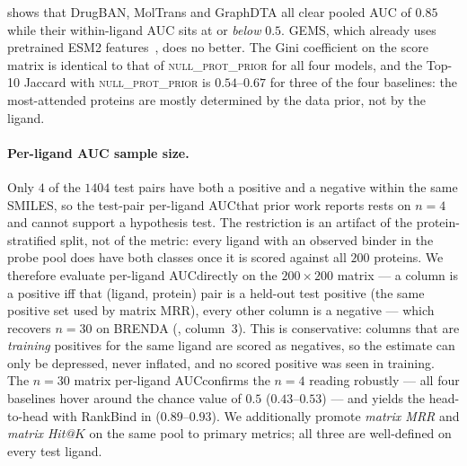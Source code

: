 \documentclass[11pt,a4paper]{article}
\newcommand{\method}{RankBind\xspace}
\newcommand{\nullprior}{\textsc{null\_prot\_prior}\xspace}
\newcommand{\plauc}{per-ligand AUC}
\newcommand{\matmrr}{matrix MRR}
\begin{document}
 shows that DrugBAN, MolTrans and GraphDTA all clear
pooled AUC of $0.85$ while their within-ligand AUC sits at or
\emph{below} $0.5$. GEMS, which already uses pretrained ESM2
features~\citep{lin2023esm2}, does no better. The Gini coefficient on
the score matrix is identical to that of \nullprior for all four
models, and the Top-10 Jaccard with \nullprior is $0.54$--$0.67$ for
three of the four baselines: the most-attended proteins are mostly
determined by the data prior, not by the ligand.

\paragraph{Per-ligand AUC sample size.}
Only $4$ of the $1404$ test pairs have both a positive and a negative
within the same SMILES, so the test-pair \plauc that prior work reports
rests on $n=4$ and cannot support a hypothesis test. The restriction is
an artifact of the protein-stratified split, not of the metric: every
ligand with an observed binder in the probe pool does have both classes
once it is scored against all $200$ proteins. We therefore evaluate
\plauc directly on the $200\times200$ matrix --- a column is a positive
iff that (ligand, protein) pair is a held-out test positive (the same
positive set used by \matmrr), every other column is a negative --- which
recovers $n=30$ on BRENDA (, column~3). This is
conservative: columns that are \emph{training} positives for the same
ligand are scored as negatives, so the estimate can only be depressed,
never inflated, and no scored positive was seen in training. The $n=30$
matrix \plauc confirms the $n=4$ reading robustly --- all four
baselines hover around the chance value of $0.5$ ($0.43$--$0.53$) ---
and yields the head-to-head with
\method in  ($0.89$--$0.93$). We additionally promote
\emph{matrix MRR} and \emph{matrix Hit@$K$} on the same pool to primary
metrics; all three are well-defined on every test ligand.
\end{document}
